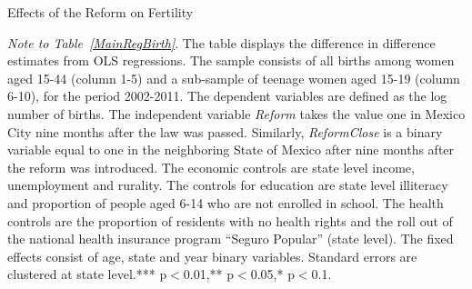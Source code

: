 \documentclass[a4paper, 11pt]{article}
\begin{document}
\begin{spacing}{2}
\begin{table}\caption{Effects of the Reform on Fertility} \label{MainRegBirth}
\begin{threeparttable}
 {\footnotesize  }
\begin{tablenotes}
\footnotesize
\item \textit{Note to Table~\ref{MainRegBirth}}. The table displays the difference in difference estimates from OLS regressions. The sample consists of all births among women aged 15-44 (column 1-5) and a sub-sample of teenage women aged 15-19 (column 6-10), for the period 2002-2011. The dependent variables are defined as the log number of births. The independent variable \textit{Reform} takes the value one in Mexico City nine months after the law was passed. Similarly, \textit{ReformClose} is a binary variable equal to one in the neighboring State of Mexico after nine months after the reform was introduced. The economic controls are state level income, unemployment and rurality. The controls for education are state level illiteracy and proportion of people aged 6-14 who are not enrolled in school. The health controls are the proportion of residents with no health rights and the roll out of the national health insurance program ``Seguro Popular'' (state level). The fixed effects consist of age, state and year binary variables. Standard errors are clustered at state level.*** p$<$0.01,** p$<$0.05,* p$<$0.1.
\end{tablenotes} 
\end{threeparttable}
\end{table}


\end{spacing}
\end{document}

